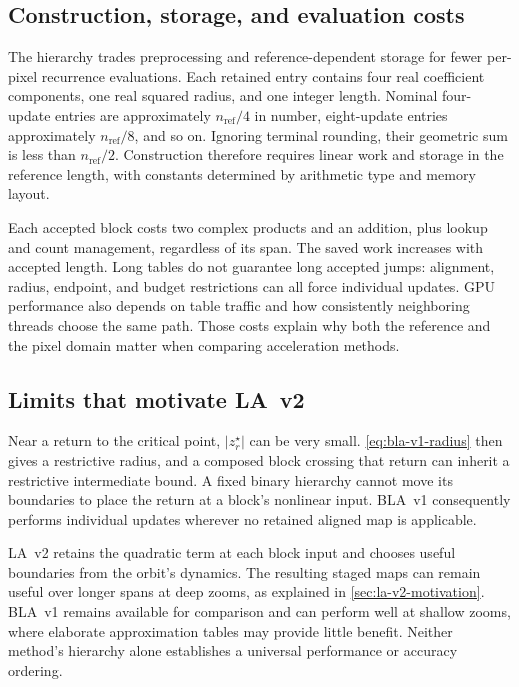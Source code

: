 \subsection{Construction, storage, and evaluation costs}
The hierarchy trades preprocessing and reference-dependent storage for fewer
per-pixel recurrence evaluations. Each retained entry contains four real
coefficient components, one real squared radius, and one integer length.
Nominal four-update entries are approximately $n_{\mathrm{ref}}/4$ in number,
eight-update entries approximately $n_{\mathrm{ref}}/8$, and so on. Ignoring
terminal rounding, their geometric sum is less than
$n_{\mathrm{ref}}/2$. Construction therefore requires linear work and storage
in the reference length, with constants determined by arithmetic type and
memory layout.

Each accepted block costs two complex products and an addition, plus lookup
and count management, regardless of its span. The saved work increases with
accepted length. Long tables do not guarantee long accepted jumps: alignment,
radius, endpoint, and budget restrictions can all force individual updates.
GPU performance also depends on table traffic and how consistently neighboring
threads choose the same path. Those costs explain why both the reference and
the pixel domain matter when comparing acceleration methods.

\subsection{Limits that motivate LA~v2}

Near a return to the critical point, $|z_r^\star|$ can be very small.
\eqref{eq:bla-v1-radius} then gives a restrictive radius, and a composed
block crossing that return can inherit a restrictive intermediate
bound. A fixed binary hierarchy cannot move its boundaries to place
the return at a block's nonlinear input. BLA~v1 consequently performs
individual updates wherever no retained aligned map is applicable.

LA~v2 retains the quadratic term at each block input and chooses useful
boundaries from the orbit's dynamics. The resulting staged maps can
remain useful over longer spans at deep zooms, as explained in
\cref{sec:la-v2-motivation}. BLA~v1 remains available for comparison
and can perform well at shallow zooms, where elaborate approximation
tables may provide little benefit. Neither method's hierarchy alone
establishes a universal performance or accuracy ordering.
